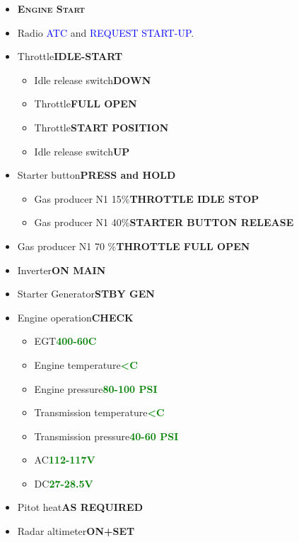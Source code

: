 \documentclass[a4paper,12pt,dvipsnames]{letter}
\newcommand{\radio}[1]{\textcolor{blue}{#1}}
\newcommand{\button}[1]{\textbf{#1}}
\newcommand{\degC}{\textdegree{}C}
\newcommand{\ok}[1]{\textcolor{Green}{\textbf{#1}}}
\newcommand{\myHead}[1]{{\LARGE\textsc{\textbf{#1}}}}
\begin{document}
{\begin{itemize}
 \item[] \myHead{Engine Start}
 \item Radio \radio{ATC} and \radio{REQUEST START-UP}.
 \item Throttle\dotfill\button{IDLE-START}
 \begin{itemize}
  \item Idle release switch\dotfill\button{DOWN}
  \item Throttle\dotfill\button{FULL OPEN}
  \item Throttle\dotfill\button{START POSITION}
  \item Idle release switch\dotfill\button{UP}
 \end{itemize}
 \item Starter button\dotfill\button{PRESS and HOLD}
 \begin{itemize}
  \item Gas producer N1 15\%\dotfill\button{THROTTLE IDLE STOP}
  \item Gas producer N1 40\%\dotfill\button{STARTER BUTTON RELEASE}
 \end{itemize}
 \item Gas producer N1 70 \%\dotfill\button{THROTTLE FULL OPEN}
 \item Inverter\dotfill\button{ON MAIN}
 \item Starter Generator\dotfill\button{STBY GEN}
 \item Engine operation\dotfill\button{CHECK}
 \begin{itemize}
  \item EGT\dotfill\ok{400-60\;\degC}
  \item Engine temperature\dotfill\ok{<\;\degC}
  \item Engine pressure\dotfill\ok{80-100 PSI}
  \item Transmission temperature\dotfill\ok{<\;\degC}
  \item Transmission pressure\dotfill\ok{40-60 PSI}
  \item AC\dotfill\ok{112-117\;V}
  \item DC\dotfill\ok{27-28.5\;V}
 \end{itemize}
 \item Pitot heat\dotfill\button{AS REQUIRED}
 \item Radar altimeter\dotfill\button{ON+SET}
\end{itemize}
}
\end{document}

